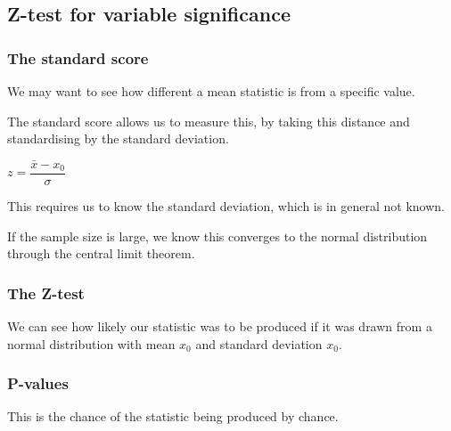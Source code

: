 
\subsection{Z-test for variable significance}

\subsubsection{The standard score}

We may want to see how different a mean statistic is from a specific value.

The standard score allows us to measure this, by taking this distance and standardising by the standard deviation.

\(z=\dfrac{\bar x-x_0}{\sigma }\)

This requires us to know the standard deviation, which is in general not known.

If the sample size is large, we know this converges to the normal distribution through the central limit theorem.

\subsubsection{The Z-test}

We can see how likely our statistic was to be produced if it was drawn from a normal distribution with mean \(x_0\) and standard deviation \(x_0\).

\subsubsection{P-values}

This is the chance of the statistic being produced by chance.

